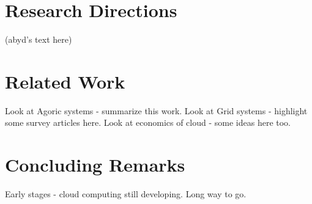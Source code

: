 \documentclass[conference,10pt]{IEEEtran}
\begin{document}

\section{Research Directions}

(abyd's text here)

\section{Related Work}

Look at Agoric systems - summarize this work.
Look at Grid systems - highlight some survey articles here.
Look at economics of cloud - some ideas here too.

\section{Concluding Remarks}

Early stages - cloud computing still developing. Long way to go.
\end{document}

